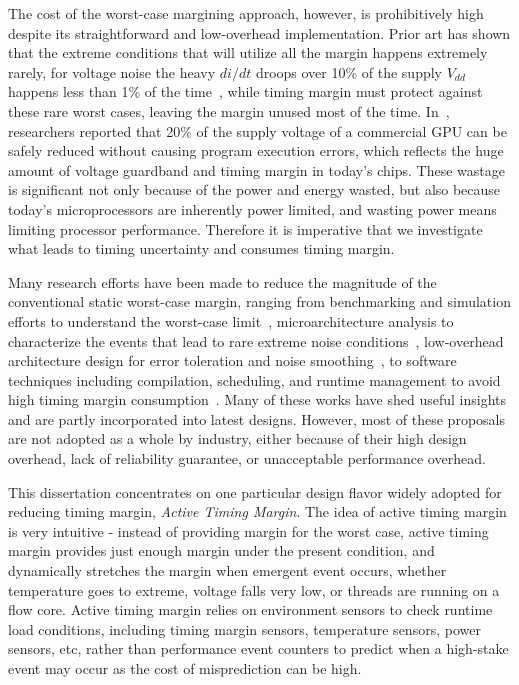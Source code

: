The cost of the worst-case margining approach, however, is prohibitively high despite its straightforward and low-overhead implementation. Prior art has shown that the extreme conditions that will utilize all the margin happens extremely rarely, for voltage noise the heavy $di/dt$ droops over 10\% of the supply $V_{dd}$ happens less than 1\% of the time~\cite{reddi2010voltage, leng2014gpuvolt}, while timing margin must protect against these rare worst cases, leaving the margin unused most of the time. In~\cite{leng2015safe}, researchers reported that 20\% of the supply voltage of a commercial GPU can be safely reduced without causing program execution errors, which reflects the huge amount of voltage guardband and timing margin in today's chips. These wastage is significant not only because of the power and energy wasted, but also because today's microprocessors are inherently power limited, and wasting power means limiting processor performance. Therefore it is imperative that we investigate what leads to timing uncertainty and consumes timing margin.

Many research efforts have been made to reduce the magnitude of the conventional static worst-case margin, ranging from benchmarking and simulation efforts to understand the worst-case limit~\cite{kim2012audit,bertran2014voltage, sarangi2008varius}, microarchitecture analysis to characterize the events that lead to rare extreme noise conditions~\cite{powell2003pipeline, gupta2007understanding, gupta2009event, reddi2009voltage}, low-overhead architecture design for error toleration and noise smoothing~\cite{gupta2008decor,reddi2009voltage,leng2015gpu, ernst2003razor}, to software techniques including compilation, scheduling, and runtime management to avoid high timing margin consumption~\cite{reddi2010eliminating,miller2012vrsync,papadimitriou2017harnessing,leng2015safe}. Many of these works have shed useful insights and are partly incorporated into latest designs. However, most of these proposals are not adopted as a whole by industry, either because of their high design overhead, lack of reliability guarantee, or unacceptable performance overhead.

This dissertation concentrates on one particular design flavor widely adopted for reducing timing margin, \textit{Active Timing Margin}. The idea of active timing margin is very intuitive - instead of providing margin for the worst case, active timing margin provides just enough margin under the present condition, and dynamically stretches the margin when emergent event occurs, whether temperature goes to extreme, voltage falls very low, or threads are running on a flow core. Active timing margin relies on environment sensors to check runtime load conditions, including timing margin sensors, temperature sensors, power sensors, etc, rather than performance event counters to predict when a high-stake event may occur as the cost of misprediction can be high. 

